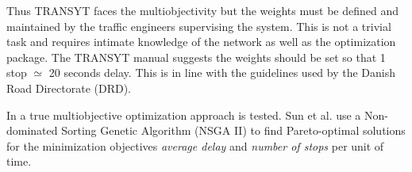 Thus TRANSYT faces the multiobjectivity but the weights must be
defined and maintained by the traffic engineers supervising the
system. This is not a trivial task and requires intimate knowledge of
the network as well as the optimization package. The TRANSYT manual
suggests the weights should be set so that 1 stop $\simeq$ 20 seconds
delay. This is in line with the guidelines used by the Danish Road
Directorate (DRD).

In \cite{41} a true multiobjective optimization approach is
tested. Sun et al. use a Non-dominated Sorting Genetic Algorithm (NSGA
II) to find Pareto-optimal solutions for the minimization objectives
\textit{average delay} and \textit{number of stops} per unit of time.

